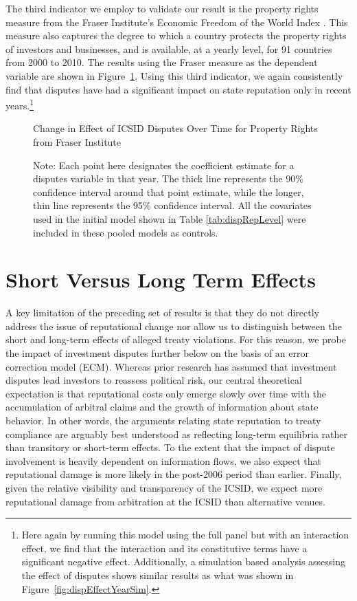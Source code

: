 \documentclass[12pt,onesided]{amsart}
\begin{document}
The third indicator we employ to validate our result is the property rights measure from the Fraser Institute's Economic Freedom of the World Index \citep{gwartney:lawson:2004}. This measure also captures the degree to which a country protects the property rights of investors and businesses, and is available, at a yearly level, for 91 countries from 2000 to 2010. The results using the Fraser measure as the dependent variable are shown in Figure~\ref{fig:dispEffectYear_fraser}. Using this third indicator, we again consistently find that disputes have had a significant impact on state reputation only in recent years.\footnote{Here again by running this model using the full panel but with an interaction effect, we find that the interaction and its constitutive terms have a significant negative effect. Additionally, a simulation based analysis assessing the effect of disputes shows similar results as what was shown in Figure~\ref{fig:dispEffectYearSim}.} 

\begin{figure}[ht]
	\centering
	\caption{Change in Effect of ICSID Disputes Over Time for Property Rights from Fraser Institute}
	\label{fig:dispEffectYear_fraser}
	\resizebox{1\textwidth}{!}{}
	\caption*{Note: Each point here designates the coefficient estimate for a disputes variable in that year. The thick line represents the 90\% confidence interval around that point estimate, while the longer, thin line represents the 95\% confidence interval. All the covariates used in the initial model shown in Table \ref{tab:dispRepLevel} were included in these pooled models as controls.}
\end{figure}
\FloatBarrier

\section*{Short Versus Long Term Effects}

A key limitation of the preceding set of results is that they do not directly address the issue of reputational change nor allow us to distinguish between the short and long-term effects of alleged treaty violations. For this reason, we probe the impact of investment disputes further below on the basis of an error correction model (ECM). Whereas prior research has assumed that investment disputes lead investors to reassess political risk, our central theoretical expectation is that reputational costs only emerge slowly over time with the accumulation of arbitral claims and the growth of information about state behavior. In other words, the arguments relating state reputation to treaty compliance are arguably best understood as reflecting long-term equilibria rather than transitory or short-term effects. To the extent that the impact of dispute involvement is heavily dependent on information flows, we also expect that reputational damage is more likely in the post-2006 period than earlier. Finally, given the relative visibility and transparency of the ICSID, we expect more reputational damage from arbitration at the ICSID than alternative venues.
\end{document}
